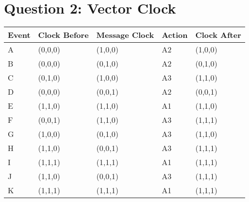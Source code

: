 \section{Question 2: Vector Clock}

\begin{tabularx}{\columnwidth}{|X|X|X|X|X|}
  \hline
  Event & Clock Before & Message Clock & Action & Clock After\\
  \hline
  A & (0,0,0) & (1,0,0) & A2 & (1,0,0)\\
  B & (0,0,0) & (0,1,0) & A2 & (0,1,0)\\
  C & (0,1,0) & (1,0,0) & A3 & (1,1,0)\\
  D & (0,0,0) & (0,0,1) & A2 & (0,0,1)\\
  E & (1,1,0) & (1,1,0) & A1 & (1,1,0)\\
  F & (0,0,1) & (1,1,0) & A3 & (1,1,1)\\
  G & (1,0,0) & (0,1,0) & A3 & (1,1,0)\\
  H & (1,1,0) & (0,0,1) & A3 & (1,1,1)\\
  I & (1,1,1) & (1,1,1) & A1 & (1,1,1)\\
  J & (1,1,0) & (0,0,1) & A3 & (1,1,1)\\
  K & (1,1,1) & (1,1,1) & A1 & (1,1,1)\\
  \hline
\end{tabularx}
